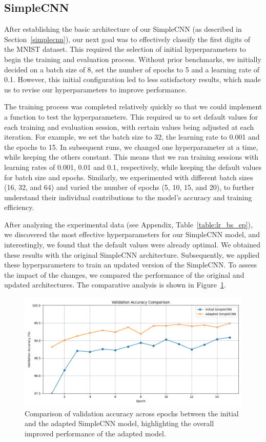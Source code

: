 \subsection{SimpleCNN}\label{resultsSimpleCNN}

After establishing the basic architecture of our SimpleCNN (as described in Section~\ref{simplecnn}), our next goal was to effectively classify the first digits of the MNIST dataset. This required the selection of initial hyperparameters to begin the training and evaluation process. Without prior benchmarks, we initially decided on a batch size of 8, set the number of epochs to 5 and a learning rate of 0.1. However, this initial configuration led to less satisfactory results, which made us to revise our hyperparameters to improve performance.

The training process was completed relatively quickly so that we could implement a function to test the hyperparameters. This required us to set default values for each training and evaluation session, with certain values being adjusted at each iteration. For example, we set the batch size to 32, the learning rate to 0.001 and the epochs to 15. In subsequent runs, we changed one hyperparameter at a time, while keeping the others constant. This means that we ran training sessions with learning rates of 0.001, 0.01 and 0.1, respectively, while keeping the default values for batch size and epochs. Similarly, we experimented with different batch sizes (16, 32, and 64) and varied the number of epochs (5, 10, 15, and 20), to further understand their individual contributions to the model's accuracy and training efficiency. 

After analyzing the experimental data (see Appendix, Table~\ref{table:lr_bs_ep}), we discovered the most effective hyperparameters for our SimpleCNN model, and interestingly, we found that the default values were already optimal. We obtained these results with the original SimpleCNN architecture. Subsequently, we applied these hyperparameters to train an updated version of the SimpleCNN\@. To assess the impact of the changes, we compared the performance of the original and updated architectures. The comparative analysis is shown in Figure~\ref{fig:SimpleCNN_old_new}.

\begin{figure} [ht]
    \centering
    \includegraphics[width=.75\textwidth]{figures/simpleCNN_old_vs_new.png}
    \caption{Comparison of validation accuracy across epochs between the initial and the adapted SimpleCNN model, highlighting the overall improved performance of the adapted model.}\label{fig:SimpleCNN_old_new}
\end{figure}

